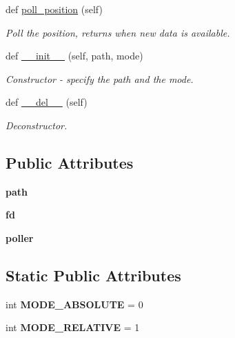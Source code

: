 \begin{DoxyCompactItemize}
def \hyperlink{classeqep_1_1eQEP_add267f1f55ca1e5fcef34b1a70db18a0}{poll\+\_\+position} (self)
\begin{DoxyCompactList}\small\item\em Poll the position, returns when new data is available. \end{DoxyCompactList}\item 
def \hyperlink{classeqep_1_1eQEP_a8110a8aae6998a20760af30020f894d2}{\+\_\+\+\_\+init\+\_\+\+\_\+} (self, path, mode)
\begin{DoxyCompactList}\small\item\em Constructor -\/ specify the path and the mode. \end{DoxyCompactList}\item 
def \hyperlink{classeqep_1_1eQEP_ac80fa9e08911c4260207aacc72541863}{\+\_\+\+\_\+del\+\_\+\+\_\+} (self)\hypertarget{classeqep_1_1eQEP_ac80fa9e08911c4260207aacc72541863}{}\label{classeqep_1_1eQEP_ac80fa9e08911c4260207aacc72541863}

\begin{DoxyCompactList}\small\item\em Deconstructor. \end{DoxyCompactList}\end{DoxyCompactItemize}
\subsection*{Public Attributes}
\begin{DoxyCompactItemize}
\item 
{\bfseries path}\hypertarget{classeqep_1_1eQEP_a1230ab18199a963f9d954777a2a336ca}{}\label{classeqep_1_1eQEP_a1230ab18199a963f9d954777a2a336ca}

\item 
{\bfseries fd}\hypertarget{classeqep_1_1eQEP_ac27da69238f8273eaf4e9883baec9aaa}{}\label{classeqep_1_1eQEP_ac27da69238f8273eaf4e9883baec9aaa}

\item 
{\bfseries poller}\hypertarget{classeqep_1_1eQEP_a3894927414d08b27680caa9580fd4776}{}\label{classeqep_1_1eQEP_a3894927414d08b27680caa9580fd4776}

\end{DoxyCompactItemize}
\subsection*{Static Public Attributes}
\begin{DoxyCompactItemize}
\item 
int {\bfseries M\+O\+D\+E\+\_\+\+A\+B\+S\+O\+L\+U\+TE} = 0\hypertarget{classeqep_1_1eQEP_adb87525577f901bdc4845d527dc87ed7}{}\label{classeqep_1_1eQEP_adb87525577f901bdc4845d527dc87ed7}

\item 
int {\bfseries M\+O\+D\+E\+\_\+\+R\+E\+L\+A\+T\+I\+VE} = 1\hypertarget{classeqep_1_1eQEP_a6e95fe57827b6139f29bfd352d6bdf08}{}\label{classeqep_1_1eQEP_a6e95fe57827b6139f29bfd352d6bdf08}

\end{DoxyCompactItemize}


